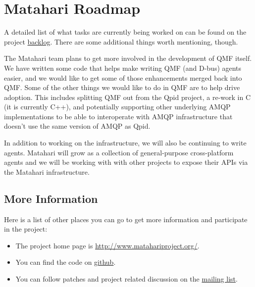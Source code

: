 \section{Matahari Roadmap}

A detailed list of what tasks are currently being worked on can be found on the project \href{https://github.com/matahari/matahari/wiki/Backlog}{backlog}.  There are some additional things worth mentioning, though.

The Matahari team plans to get more involved in the development of QMF itself.  We have written some code that helps make writing QMF (and D-bus) agents easier, and we would like to get some of those enhancements merged back into QMF.  Some of the other things we would like to do in QMF are to help drive adoption.  This includes splitting QMF out from the Qpid project, a re-work in C (it is currently C++), and potentially supporting other underlying AMQP implementations to be able to interoperate with AMQP infrastructure that doesn't use the same version of AMQP as Qpid.

In addition to working on the infrastructure, we will also be continuing to write agents.  Matahari will grow as a collection of general-purpose cross-platform agents and we will be working with with other projects to expose their APIs via the Matahari infrastructure.

\subsection{More Information}

Here is a list of other places you can go to get more information and participate in the project:

\begin{itemize}
\item The project home page is \url{http://www.matahariproject.org/}.
\item You can find the code on \href{https://github.com/matahari/matahari}{github}.
\item You can follow patches and project related discussion on the \href{https://fedorahosted.org/mailman/listinfo/matahari}{mailing list}. 
\end{itemize}
